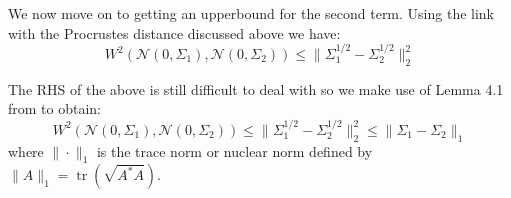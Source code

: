 \documentclass{article}
\theoremstyle{definition}
\theoremstyle{remark}
\begin{document}
We now move on to getting an upperbound for the second term. Using the link with the Procrustes distance discussed above we have:
\begin{equation*}
    W^2(\mathcal{N}(0,\Sigma_1),\mathcal{N}(0,\Sigma_2))\leq\|\Sigma_{1}^{1/2}-\Sigma_{2}^{1/2}\|_{2}^{2}
\end{equation*}

The RHS of the above is still difficult to deal with so we make use of Lemma 4.1 from \cite{powers1970free} to obtain:
\begin{equation*}
    W^2(\mathcal{N}(0,\Sigma_1),\mathcal{N}(0,\Sigma_2))\leq\|\Sigma_{1}^{1/2}-\Sigma_{2}^{1/2}\|_{2}^{2}\leq\|\Sigma_1-\Sigma_2\|_{1}
\end{equation*}
where $\|\cdot\|_1$ is the trace norm or nuclear norm defined by $\|A\|_{1}=\operatorname{tr}(\sqrt{A^{*}A})$.
\end{document}
